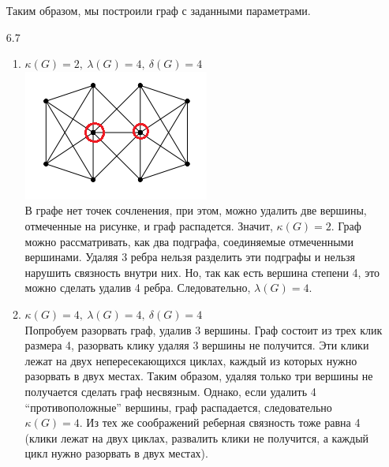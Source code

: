 \documentclass[10pt]{article}
\begin{document}
\begin{enumerate}
Таким образом, мы построили граф с заданными параметрами.

\item[6.7]
\begin{enumerate}
	\item $\kappa(G) = 2,\ \lambda(G) = 4,\ \delta(G) = 4$\\
	\includegraphics{graph.png}\\
	В графе нет точек сочленения, при этом, можно удалить две вершины, отмеченные на рисунке, и граф распадется. Значит, $\kappa(G) = 2$. Граф можно рассматривать, как два подграфа, соединяемые отмеченными вершинами. Удаляя 3 ребра нельзя разделить эти подграфы и нельзя нарушить связность внутри них. Но, так как есть вершина степени 4, это можно сделать удалив 4 ребра. Следовательно, $\lambda(G) = 4$.
	
	\item $\kappa(G) = 4,\ \lambda(G) = 4,\ \delta(G) = 4$\\
	Попробуем разорвать граф, удалив 3 вершины. Граф состоит из трех клик размера 4, разорвать клику удаляя 3 вершины не получится. Эти клики лежат на двух непересекающихся циклах, каждый из которых нужно разорвать в двух местах. Таким образом, удаляя только три вершины не получается сделать граф несвязным. Однако, если удалить 4 ``противоположные'' вершины, граф распадается, следовательно $\kappa(G) = 4$. Из тех же соображений реберная связность тоже равна 4 (клики лежат на двух циклах, развалить клики не получится, а каждый цикл нужно разорвать в двух местах).
\end{enumerate}


\end{enumerate}
\end{document}
